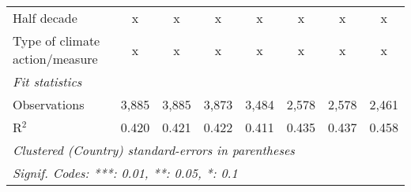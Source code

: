 \begin{tabular}{lccccccc}
   Half decade                                                                           & x              & x              & x             & x              & x             & x              & x\\  
   Type of climate action/measure                                                        & x              & x              & x             & x              & x             & x              & x\\  
   \midrule \emph{Fit statistics}\\
   Observations                                                                          & 3,885          & 3,885          & 3,873         & 3,484          & 2,578         & 2,578          & 2,461\\  
   R$^2$                                                                                 & 0.420          & 0.421          & 0.422         & 0.411          & 0.435         & 0.437          & 0.458\\  
   \midrule
   \multicolumn{8}{l}{\emph{Clustered (Country) standard-errors in parentheses}}\\
   \multicolumn{8}{l}{\emph{Signif. Codes: ***: 0.01, **: 0.05, *: 0.1}}\\
\end{tabular}
\par\endgroup


